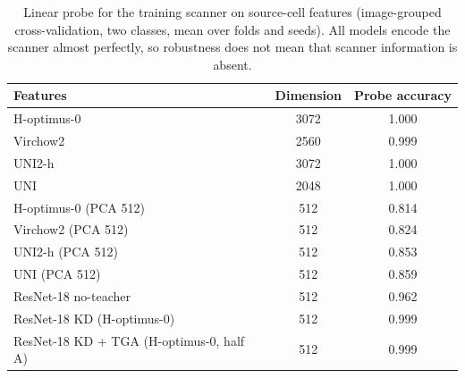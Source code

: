\begin{table}[htbp]
{\caption{Linear probe for the training scanner on source-cell features (image-grouped cross-validation, two classes, mean over folds and seeds). All models encode the scanner almost perfectly, so robustness does not mean that scanner information is absent.}}
{%
\footnotesize
\setlength{\tabcolsep}{5pt}
\begin{tabular}{@{}lcc@{}}
\toprule
Features & Dimension & Probe accuracy \\
\midrule
H-optimus-0 & 3072 & 1.000 \\
Virchow2 & 2560 & 0.999 \\
UNI2-h & 3072 & 1.000 \\
UNI & 2048 & 1.000 \\
H-optimus-0 (PCA 512) & 512 & 0.814 \\
Virchow2 (PCA 512) & 512 & 0.824 \\
UNI2-h (PCA 512) & 512 & 0.853 \\
UNI (PCA 512) & 512 & 0.859 \\
ResNet-18 no-teacher & 512 & 0.962 \\
ResNet-18 KD (H-optimus-0) & 512 & 0.999 \\
ResNet-18 KD + TGA (H-optimus-0, half A) & 512 & 0.999 \\
\bottomrule
\end{tabular}
}
\end{table}
